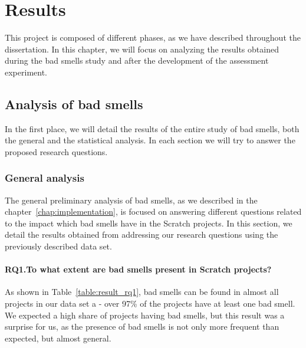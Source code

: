 

\cleardoublepage
\chapter{Results}
\label{chap:results}

This project is composed of different phases, as we have described throughout the dissertation. In this chapter, we will focus on analyzing the results obtained during the bad smells study and after the development of the assessment experiment.

\section{Analysis of bad smells}
\label{sec:results_analysis}

In the first place, we will detail the results of the entire study of bad smells, both the general and the statistical analysis. In each section we will try to answer the proposed research questions.  

\subsection{General analysis}
\label{subsec:results_general}

The general preliminary analysis of bad smells, as we described in the chapter~\ref{chap:implementation}, is focused on answering different questions related to the impact which bad smells have in the Scratch projects. In this section, we detail the results obtained from addressing our research questions using the previously described data set. 

\subsubsection{RQ1.To what extent are bad smells present in Scratch projects?}
\label{subsubsec:rq1_results}

As shown in Table~\ref{table:result_rq1}, bad smells can be found in almost all projects in our data set a - over 97\% of the projects have at least one bad smell. We expected a high share of projects having bad smells, but this result was a surprise for us, as the presence of bad smells is not only more frequent than expected, but almost general.


